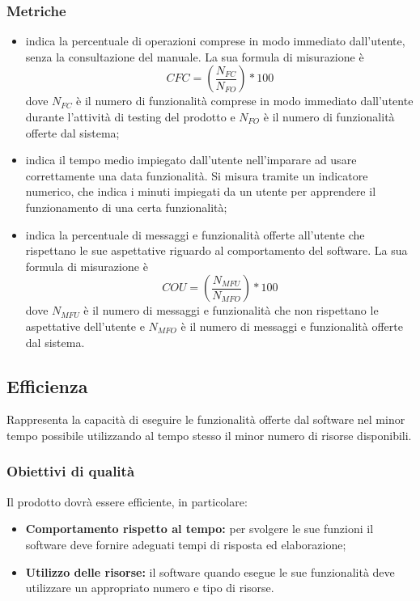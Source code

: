 \documentclass[PianoDiQualifica.tex]{subfiles}
\begin{document}
\subsubsection{Metriche}
\begin{itemize}
	\item {} indica la percentuale di operazioni comprese in modo immediato dall'utente, senza la consultazione del manuale.  La sua formula di misurazione è \[CFC=(\frac{N_{FC}}{N_{FO}})*100\] dove $ N_{FC} $ è il numero di funzionalità comprese in modo immediato dall'utente durante l'attività di testing del prodotto e $ N_{FO} $ è il numero di funzionalità offerte dal sistema;
	\item {} indica il tempo medio impiegato dall'utente nell'imparare ad usare correttamente una data funzionalità. Si misura tramite un indicatore numerico, che indica i minuti impiegati da un utente per apprendere il funzionamento di una certa funzionalità;
	\item {} indica la percentuale di messaggi e funzionalità offerte all'utente che rispettano le sue aspettative riguardo al comportamento del software.  La sua formula di misurazione è \[COU=(\frac{N_{MFU}}{N_{MFO}})*100\] dove $ N_{MFU} $ è il numero di messaggi e funzionalità che non rispettano le aspettative dell'utente e $ N_{MFO} $ è il numero di messaggi e funzionalità offerte dal sistema.	
\end{itemize}	
\subsection{Efficienza}
Rappresenta la capacità di eseguire le funzionalità offerte dal software nel minor tempo possibile utilizzando al tempo stesso il minor numero di risorse disponibili.
\subsubsection{Obiettivi di qualità}
Il prodotto dovrà essere efficiente, in particolare:
\begin{itemize}
	\item \textbf{Comportamento rispetto al tempo:} per svolgere le sue funzioni il software deve fornire adeguati tempi di risposta ed elaborazione;
	\item \textbf{Utilizzo delle risorse:} il software quando esegue le sue funzionalità deve utilizzare un appropriato numero e tipo di risorse.
\end{itemize}
\end{document}
